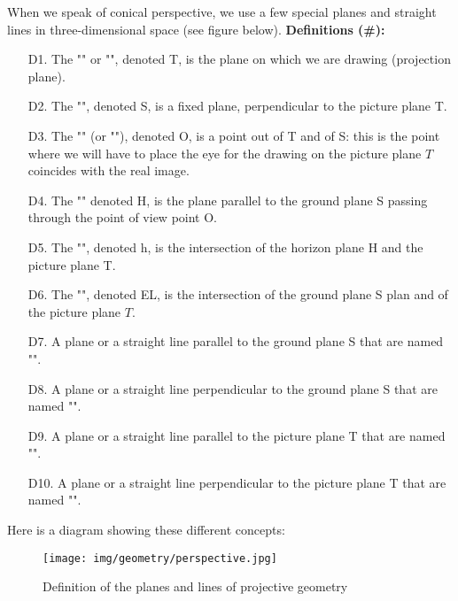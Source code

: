 	When we speak of conical perspective, we use a few special planes and straight lines in three-dimensional space (see figure below).
	\textbf{Definitions (\#\mydef):}
	\begin{enumerate}
		\item[D1.] The "" or "", denoted T, is the plane on which we are drawing (projection plane).

		\item[D2.] The "", denoted S, is a fixed plane, perpendicular to the picture plane T.
	
		\item[D3.] The "" (or ""), denoted O, is a point out of T and of S: this is the point where we will have to place the eye for the drawing on the picture plane $T$ coincides with the real image.
	
		\item[D4.] The "" denoted H, is the plane parallel to the ground plane S passing through the point of view point O.
	
		\item[D5.] The "", denoted h, is the intersection of the horizon plane H and the picture plane T.
		
		\item[D6.] The "", denoted EL, is the intersection of the ground plane S plan and of the picture plane $T$.
		
		\item[D7.] A plane or a straight line parallel to the ground plane S that are named "".
		
		\item[D8.] A plane or a straight line perpendicular to the ground plane S that are named "".
		
		\item[D9.] A plane or a straight line parallel to the picture plane T that are named "".
		
		\item[D10.] A plane or a straight line perpendicular to the picture plane T that are named "".
	\end{enumerate}
	Here is a diagram showing these different concepts:
	\begin{figure}[H]
		\centering
		\texttt{[image: img/geometry/perspective.jpg]}
		\caption{Definition of the planes and lines of projective geometry}
	\end{figure}
	
